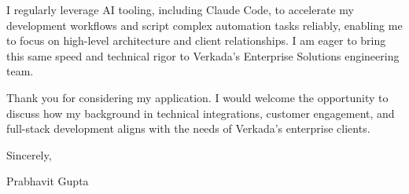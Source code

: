 \documentclass[11pt,a4paper]{article}
\begin{document}
I regularly leverage AI tooling, including Claude Code, to accelerate my development workflows and script complex automation tasks reliably, enabling me to focus on high-level architecture and client relationships. I am eager to bring this same speed and technical rigor to Verkada’s Enterprise Solutions engineering team.

Thank you for considering my application. I would welcome the opportunity to discuss how my background in technical integrations, customer engagement, and full-stack development aligns with the needs of Verkada's enterprise clients. 

Sincerely,

Prabhavit Gupta
\end{document}
